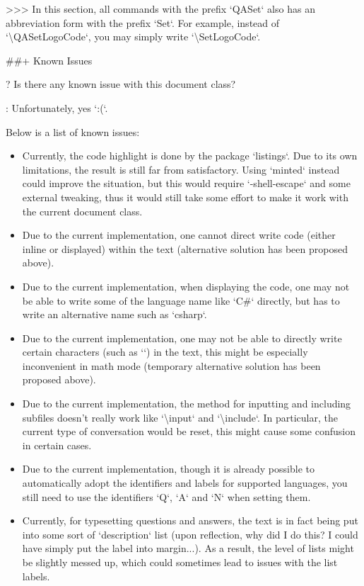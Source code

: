 \documentclass[%
  use style = classical,
  scroll,
]{Q-and-A}
\begin{document}
  >>> In this section, all commands with the prefix `QASet` also has an abbreviation form with the prefix `Set`. For example, instead of `\textbackslash QASetLogoCode`, you may simply write `\textbackslash SetLogoCode`.


##+ {Known Issues}

?
  Is there any known issue with this document class?

:
  Unfortunately, yes `:(`.

  Below is a list of known issues:

  \begin{itemize}
    \item Currently, the code highlight is done by the package `listings`. Due to its own limitations, the result is still far from satisfactory. Using `minted` instead could improve the situation, but this would require `-shell-escape` and some external tweaking, thus it would still take some effort to make it work with the current document class.
    \item Due to the current implementation, one cannot direct write code (either inline or displayed) within the text (alternative solution has been proposed above).
    \item Due to the current implementation, when displaying the code, one may not be able to write some of the language name like `C\#` directly, but has to write an alternative name such as `csharp`.
    \item Due to the current implementation, one may not be able to directly write certain characters (such as `\textasterisk`) in the text, this might be especially inconvenient in math mode (temporary alternative solution has been proposed above).
    \item Due to the current implementation, the method for inputting and including subfiles doesn't really work like `\textbackslash input` and `\textbackslash include`. In particular, the current type of conversation would be reset, this might cause some confusion in certain cases.
    \item Due to the current implementation, though it is already possible to automatically adopt the identifiers and labels for supported languages, you still need to use the identifiers `Q`, `A` and `N` when setting them.
    \item Currently, for typesetting questions and answers, the text is in fact being put into some sort of `description` list (upon reflection, why did I do this? I could have simply put the label into margin...). As a result, the level of lists might be slightly messed up, which could sometimes lead to issues with the list labels.
  \end{itemize}
\end{document}
